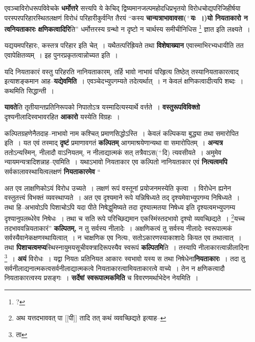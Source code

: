 \documentclass[article,12pt,a4paper]{memoir}
\newcommand{\add}[1]{($^{+}$#1)}
\begin{document}
	  \pstart एवञ्चाविरोधरूपविवेचके \textbf{धर्मोत्तरे} सत्त्यपि ये केचिद् द्विष्यमानजल्पमहोदधिप्रभृतयो विरोधचोद्यपरिजिहीर्षया परस्परपरिहारस्थितलक्षणं विरोधं परिहारीकुर्वन्ति तैरयं “कस्य \textbf{चान्यत्राभावावसा\add{यः ।}यो नियताकारो न त्वनियताकारः क्षणिकत्वादिरि}ति” धर्मोत्तरस्य ग्रन्थो न दृष्टो न चार्थस्य समीचीनिधिस \footnote{?} ज्ञात इति लक्ष्यते ।
	\pend
      

	  \pstart यद्ययमपरिहारः, कस्तत्र परिहार इति चेत् । यथैतत्परिह्रियते तथा \textbf{विशेषाख्यान} एवास्माभिरभ्यधायीति तत एवापेक्षितव्यम् । इह पुनरप्रकृतत्वान्नोच्यत इति ।
	\pend
      

	  \pstart यदि नियताकारं वस्तु परिहरति नानियताकारम्, तर्हि भावो नाभावं परिहृत्य तिष्ठेत् तस्यानियताकारत्वाद् इत्याशङ्कमान आह--\textbf{यद्येवमिति} । एवञ्चेदभ्युपगम्यते तदेत्यर्थात् । न केवलं क्षणिकत्वादीत्यपि शब्दः । कथमिति सिद्धान्ती ।
	\pend
      

	  \pstart \textbf{यावते}ति तृतीयान्तप्रतिनिरूपको निपातोऽत्र यस्मादित्यस्यार्थे वर्त्तते । \textbf{वस्तुरूपविविक्तो} दृश्यनीलादिस्वभावरहित \textbf{आकारो} यस्येति विग्रहः ।
	\pend
      

	  \pstart कल्पितग्रहणेनैतदाह--नाभावो नाम कश्चित् प्रमाणसिद्धोऽस्ति । केवलं कल्पिकया बुद्ध्या तथा समारोपित इति । यत एवं तस्माद् \textbf{दृष्टं} प्रमाणावगतं \textbf{कल्पितम्} आगमाश्रयेणान्यथा वा समारोपितम् । \textbf{अन्यत्र} ततोऽन्यस्मिन्, नीलादौ वाऽनियतम्, न नीलाद्यात्मकं सत् तत्रैवाऽस\add{दि} त्यवसीयते । अमुमेव न्यायमन्यत्रादिशन्ना\leavevmode{}ह--एवमिति । यथाऽभावो नियताकार एव कल्पितो नानियताकार एवं \textbf{नित्यत्वमपि} सर्वकालावस्थायित्वलक्षणं \textbf{नियताकारमेव}  \leavevmode{} “
	  
	अत एव लाक्षणिकोऽयं विरोध उच्यते । लक्षणं रूपं वस्तूनां प्रयोजनमस्येति कृत्वा । विरोधेन ह्यनेन वस्तुतत्त्वं विभक्तं व्यवस्थाप्यते । अत एव दृश्यमाने रूपे यन्निषिध्यते तद् दृश्यमेवाभ्युपगम्य निषिध्यते । तथा हि--अभावोऽपि पिशाचोऽपि यदा पीते निषेद्धुमिष्यते तदा दृश्यात्मतया निषेध्य इति दृश्यत्वमभ्युपगम्य दृश्यानुपलब्धेरेव निषेधः । तथा च सति रूपे परिच्छिद्यमान एकस्मिंस्तदभावो दृश्यो व्यवच्छिद्यते । \footnote{अथ यत्तदभाववत् पा [[पी]] तादि तत् कथं व्यवच्छिद्यते इत्याह--\cite{dp-msD-n}}\-यच्च तदभाववन्नियताकारं” \textbf{कल्पितम्,} न तु सर्वस्य नीलादेः । अक्षणिकत्वं तु सर्वस्य नीलादेः स्वरूपात्मकं सर्वस्यैवानेकक्षणस्थायित्वात् । न चाक्षणिक एव नित्यः, सतोऽकारणस्याकाशादेः कियत एव तथात्वात् । तथा \textbf{पिशाचत्वमप्य}स्थिस्नायुमयसूचीवक्त्रादिरूपस्यैव स्वरूपं \textbf{कल्पितमि}ति । तस्यापि नीलाकारत्वान्नीलादिना \footnote{ता} । \textbf{अयं} विरोधः । यद्वा नियतः प्रतिनियत आकारः स्वभावो यस्य स तथा निषेधेना\textbf{नियताकारः} । तदा तु सर्वनीलाद्यनात्मकत्वसर्वनीलाद्यात्मकत्वे नियताकारत्वामियताकारत्वे वाच्ये । तेन न क्षणिकत्वादौ नियताकारत्वस्य प्रसङ्गः । \textbf{सर्देषां स्वरूपात्मकमिति} च विवरणमर्थाभेदेन नेयमिति ।
	\pend
      
\end{document}

